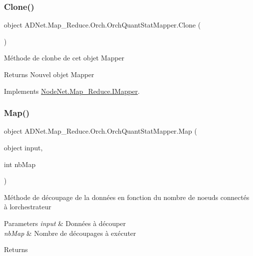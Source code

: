 \subsubsection{\texorpdfstring{Clone()}{Clone()}}
{\footnotesize\ttfamily object A\+D\+Net.\+Map\+\_\+\+Reduce.\+Orch.\+Orch\+Quant\+Stat\+Mapper.\+Clone (\begin{DoxyParamCaption}{ }\end{DoxyParamCaption})}



Méthode de clonbe de cet objet Mapper 

\begin{DoxyReturn}{Returns}
Nouvel objet Mapper
\end{DoxyReturn}


Implements \hyperlink{interface_node_net_1_1_map___reduce_1_1_i_mapper_a8d322c9ffa12be02d65da6c8b8563c77}{Node\+Net.\+Map\+\_\+\+Reduce.\+I\+Mapper}.

\mbox{\label{class_a_d_net_1_1_map___reduce_1_1_orch_1_1_orch_quant_stat_mapper_a0e13cf0b99158b111ccb3d712435d4f1}} 
\subsubsection{\texorpdfstring{Map()}{Map()}}
{\footnotesize\ttfamily object A\+D\+Net.\+Map\+\_\+\+Reduce.\+Orch.\+Orch\+Quant\+Stat\+Mapper.\+Map (\begin{DoxyParamCaption}\item[{object}]{input,  }\item[{int}]{nb\+Map }\end{DoxyParamCaption})}



Méthode de découpage de la données en fonction du nombre de noeuds connectés à l\textquotesingle{}orchestrateur 


\begin{DoxyParams}{Parameters}
{\em input} & Données à découper\\
\hline
{\em nb\+Map} & Nombre de découpages à exécuter\\
\hline
\end{DoxyParams}
\begin{DoxyReturn}{Returns}

\end{DoxyReturn}



